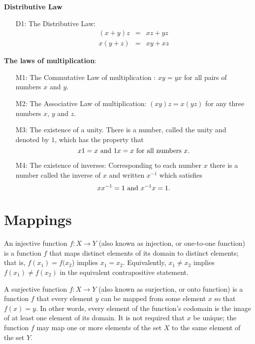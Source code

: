 \begin{definition}{\bf Distributive Law}
\begin{itemize}
\item[D1:] The Distributive Law:
\begin{eqnarray*}
(x+y)z &=& xz + yz\\
x(y+z) &=& xy + xz
\end{eqnarray*}
\end{itemize}
\end{definition}

\begin{definition}{\bf The laws of multiplication}:\\
\begin{itemize}
\item[M1:] The Commutative Law of multiplication : $x y = y x$ for all pairs of numbers $x$ and $y$.
\item[M2:] The Associative Law of multiplication: $(xy)z = x (yz)$ for any three numbers $x$, $y$ and $z$.
\item[M3:] The existence of a unity. There is a number, called the unity and denoted by $1$, which has the property that
$$ x1= x \hbox{~and~} 1x = x \hbox{~for all numbers~} x.$$
\item[M4:] The existence of inverses: Corresponding to each number $x$ there is a number called the inverse of $x$ and written $x^{-1}$ which satisfies
$$xx^{-1} = 1\hbox{~and~} x^{-1}x = 1.$$
\end{itemize}
\end{definition}

\section{Mappings}
\begin{definition}
An injective function $f: X\rightarrow Y$ (also known as injection, or one-to-one function) is a function $f$ that maps distinct elements of its domain to distinct elements; that is, $f(x_1) = f(x_2$) implies $x_1 = x_2$. 
Equivalently, $x_1 \ne x_2$ implies $f(x_1) \ne f(x_2)$ in the equivalent contrapositive statement.
\end{definition}

\begin{definition}
A surjective function  $f: X\rightarrow Y$ (also known as surjection, or onto function) is a function $f$ that every element $y$ can be mapped from some element $x$ so that $f(x) = y$. 
In other words, every element of the function's codomain is the image of at least one element of its domain. It is not required that $x$ be unique; the function $f$ 
may map one or more elements of the set $X$ to the same element of the set $Y$.
\end{definition}

